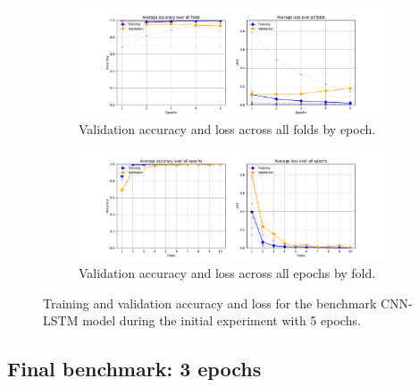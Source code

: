 \begin{figure}[p]
    \centering
    
    \begin{subfigure}[t]{\textwidth}
        \centering
        \includegraphics[trim={3cm 0 3cm 0.8cm},clip,width=\textwidth]{img/ch3/baseline_results/5_epochs_by_epoch.pdf}
        \caption{Validation accuracy and loss across all folds by epoch.}
        \label{fig:baseline5-by-epoch}
    \end{subfigure}
    
    \vspace{0.5cm}
    
    \begin{subfigure}[t]{\textwidth}
        \centering
        \includegraphics[trim={3cm 0 3cm 0.8cm},clip,width=\textwidth]{img/ch3/baseline_results/5_epochs_by_fold.pdf}
        \caption{Validation accuracy and loss across all epochs by fold.}
        \label{fig:baseline5-by-fold}
    \end{subfigure}
    
    \caption{Training and validation accuracy and loss for the benchmark CNN-LSTM model during the initial experiment with 5 epochs.}
    \label{fig:baseline5-acc-loss}
\end{figure}

\subsection{Final benchmark: 3 epochs}

